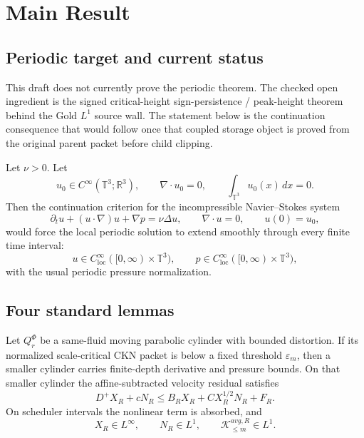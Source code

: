 \section{Main Result}

\subsection{Periodic target and current status}

This draft does not currently prove the periodic theorem.  The checked open
ingredient is the signed critical-height sign-persistence / peak-height theorem behind the Gold \(L^1\) source wall.  The statement below is
the continuation consequence that would follow once that coupled storage object
is proved from the original parent packet before child clipping.

\begin{proposition}
Let \(\nu>0\). Let
\[
u_0\in C^\infty(\mathbb T^3;\mathbb R^3),\qquad
\nabla\cdot u_0=0,\qquad \int_{\mathbb T^3}u_0(x)\,dx=0.
\]
Then the continuation criterion for the incompressible Navier--Stokes system
\[
\partial_tu+(u\cdot\nabla)u+\nabla p=\nu\Delta u,
\qquad \nabla\cdot u=0,
\qquad u(0)=u_0,
\]
would force the local periodic solution to extend smoothly through every finite
time interval:
\[u\in C^\infty_{\mathrm{loc}}([0,\infty)\times\mathbb T^3),
\qquad p\in C^\infty_{\mathrm{loc}}([0,\infty)\times\mathbb T^3),
\]
with the usual periodic pressure normalization.
\end{proposition}

\subsection{Four standard lemmas}

\begin{lemma}
Let \(Q_r^\Phi\) be a same-fluid moving parabolic cylinder with bounded distortion. If its normalized scale-critical CKN packet is below a fixed threshold \(\varepsilon_m\), then a smaller cylinder carries finite-depth derivative and pressure bounds. On that smaller cylinder the affine-subtracted velocity residual satisfies
\[
D^+X_R+cN_R\le B_RX_R+C X_R^{1/2}N_R+F_R.
\]
On scheduler intervals the nonlinear term is absorbed, and
\[
X_R\in L^\infty,\qquad N_R\in L^1,
\qquad \mathcal K_{\le m}^{avg,R}\in L^1.
\]
\end{lemma}

